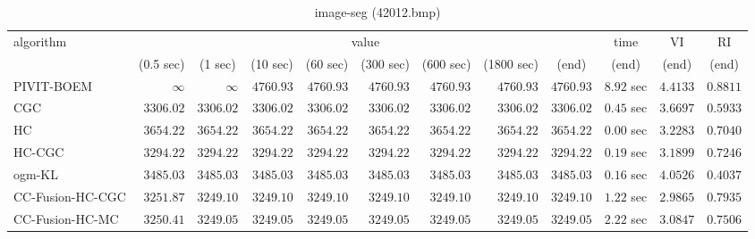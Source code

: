 \begin{table}[H]
\scriptsize
\centering
\caption{image-seg (42012.bmp)}
\label{tab:anytimetable-image-seg-42012.bmp}
\begin{tabular}{lrrrrrrrrrrr}
\toprule
           algorithm &                                   \multicolumn{8}{c}{value} & \multicolumn{1}{c}{time}    & \multicolumn{1}{c}{VI}  & \multicolumn{1}{c}{RI} \\  
\cmidrule(lr){2-9}\cmidrule(lr){10-10} \cmidrule(lr){11-11} \cmidrule(lr){12-12}   
                     & \multicolumn{1}{c}{(0.5 sec)} & \multicolumn{1}{c}{(1 sec)} & \multicolumn{1}{c}{(10 sec)} & \multicolumn{1}{c}{(60 sec)} & \multicolumn{1}{c}{(300 sec)} & \multicolumn{1}{c}{(600 sec)} & \multicolumn{1}{c}{(1800 sec)} & \multicolumn{1}{c}{(end)} & \multicolumn{1}{c}{(end)}    & \multicolumn{1}{c}{(end)}   & \multicolumn{1}{c}{(end)}  \\ \midrule 
          PIVIT-BOEM & $\infty$ & $\infty$ & $      4760.93$ & $      4760.93$ & $      4760.93$ & $      4760.93$ & $      4760.93$ & $      4760.93$ & $         8.92$ sec    & $       4.4133$  & $       0.8811$ \\ 
                 CGC & $      3306.02$ & $      3306.02$ & $      3306.02$ & $      3306.02$ & $      3306.02$ & $      3306.02$ & $      3306.02$ & $      3306.02$ & $         0.45$ sec    & $       3.6697$  & $       0.5933$ \\ 
                  HC & $      3654.22$ & $      3654.22$ & $      3654.22$ & $      3654.22$ & $      3654.22$ & $      3654.22$ & $      3654.22$ & $      3654.22$ & $         0.00$ sec    & $       3.2283$  & $       0.7040$ \\ 
              HC-CGC & $      3294.22$ & $      3294.22$ & $      3294.22$ & $      3294.22$ & $      3294.22$ & $      3294.22$ & $      3294.22$ & $      3294.22$ & $         0.19$ sec    & $       3.1899$  & $       0.7246$ \\ 
              ogm-KL & $      3485.03$ & $      3485.03$ & $      3485.03$ & $      3485.03$ & $      3485.03$ & $      3485.03$ & $      3485.03$ & $      3485.03$ & $         0.16$ sec    & $       4.0526$  & $       0.4037$ \\ 
    CC-Fusion-HC-CGC & $      3251.87$ & $      3249.10$ & $      3249.10$ & $      3249.10$ & $      3249.10$ & $      3249.10$ & $      3249.10$ & $      3249.10$ & $         1.22$ sec    & $       2.9865$  & $       0.7935$ \\ 
     CC-Fusion-HC-MC & $      3250.41$ & $      3249.05$ & $      3249.05$ & $      3249.05$ & $      3249.05$ & $      3249.05$ & $      3249.05$ & $      3249.05$ & $         2.22$ sec    & $       3.0847$  & $       0.7506$ \\ 

\end{tabular}
\end{table}

